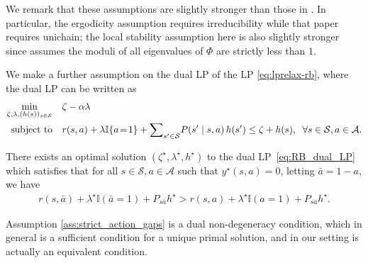 \documentclass[mnsc,nonblindrev]{informs3}
\newcommand{\States}{\mathcal{S}}
\newcommand{\Actions}{\mathcal{A}}
\begin{document}
We remark that these assumptions are slightly stronger than those in \citet{hong2024achieving}.
In particular, the ergodicity assumption requires irreducibility while that paper requires unichain;
the local stability assumption here is also slightly stronger since \citet{hong2024achieving} assumes the moduli of all eigenvalues of $\Phi$ are strictly less than $1$.


We make a further assumption on the dual LP of the LP \eqref{eq:lprelax-rb}, where the dual LP can be written as
\begin{subequations}
\label{eq:RB_dual_LP}
\vspace{-0.05cm}\begin{align}
\min_{\zeta,\lambda,(h(s))_{s\in\mathcal{S}}}\quad & \zeta - \alpha \lambda \\
\text{subject to}\quad 
& r(s,a)+\lambda\mathbb{I}\{a\!=\!1\} + \sum\nolimits_{s'\in\mathcal S} \! P(s'\mid s,a)\, h(s')\le\zeta + h(s),\;\; \forall s\in\mathcal S,a\in\mathcal A.
\end{align}
\end{subequations}


\begin{assumption}
\label{ass:strict_action_gaps}
There exists an optimal solution $(\zeta^\star, \lambda^\star, h^\star)$ to the dual LP~\eqref{eq:RB_dual_LP} which satisfies that for all $s \in \States, a\in \Actions$ such that $y^\star(s,a)=0$, letting $\bar{a} = 1-a$, we have
\begin{align*}
    r(s, \bar{a}) + \lambda^\star \mathbb{I}(\bar{a}=1) + P_{s \bar{a}}h^\star > r(s, a) + \lambda^\star \mathbb{I}(a=1) + P_{s a}h^\star.
\end{align*}
\end{assumption}
Assumption \ref{ass:strict_action_gaps} is a dual non-degeneracy condition, which in general is a sufficient condition for a unique primal solution, and in our setting is actually an equivalent condition.
\end{document}
